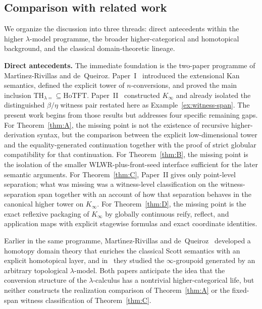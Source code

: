 \documentclass[webpdf,traditional,large,numbered]{oup-authoring-template}
\theoremstyle{thmstyleone}%
\theoremstyle{thmstyletwo}%
\theoremstyle{thmstylethree}%
\newcommand{\Kinf}{K_\infty}
\newcommand{\THeq}{\mathrm{TH}_{\lambda =}}
\newcommand{\HoTFT}{\mathrm{HoTFT}}
\begin{document}
\subsection{Comparison with related work}

We organize the discussion into three threads: direct antecedents within the
higher $\lambda$-model programme, the broader higher-categorical and
homotopical background, and the classical domain-theoretic lineage.

\medskip
\noindent\textbf{Direct antecedents.}
The immediate foundation is the two-paper programme of Mart\'{\i}nez-Rivillas
and de~Queiroz.  Paper~I~\cite{MRdQ:theory} introduced the extensional Kan
semantics, defined the explicit tower of $n$-conversions, and proved the main
inclusion $\THeq\subseteq\HoTFT$.  Paper~II~\cite{MRdQ:Kinfinity} constructed
$\Kinf$ and already isolated the distinguished $\beta/\eta$ witness pair
restated here as Example~\ref{ex:witness-span}.  The present work begins from
those results but addresses four specific remaining gaps.  For
Theorem~\ref{thm:A}, the missing point is not the existence of recursive
higher-derivation syntax, but the comparison between the explicit
low-dimensional tower and the equality-generated continuation together with the
proof of strict globular compatibility for that continuation.  For
Theorem~\ref{thm:B}, the missing point is the isolation of the smaller
WLWR-plus-front-seed interface sufficient for the later semantic arguments.
For Theorem~\ref{thm:C}, Paper~II gives only point-level separation; what was
missing was a witness-level classification on the witness-separation span together
with an account of how that separation behaves in the canonical higher tower on
$\Kinf$.  For
Theorem~\ref{thm:D}, the missing point is the exact reflexive packaging of
$\Kinf$ by globally continuous reify, reflect, and application maps with
explicit stagewise formulas and exact coordinate identities.

Earlier in the same programme, Mart\'{\i}nez-Rivillas and
de~Queiroz~\cite{MRdQ:homotopydomain} developed a homotopy domain theory that
enriches the classical Scott semantics with an explicit homotopical layer, and
in~\cite{MRdQ:topological} they studied the $\infty$-groupoid generated by an
arbitrary topological $\lambda$-model.  Both papers anticipate the idea that
  the conversion structure of the $\lambda$-calculus has a nontrivial
  higher-categorical life, but neither constructs the realization comparison of
  Theorem~\ref{thm:A} or the fixed-span witness classification of
  Theorem~\ref{thm:C}.
\end{document}
